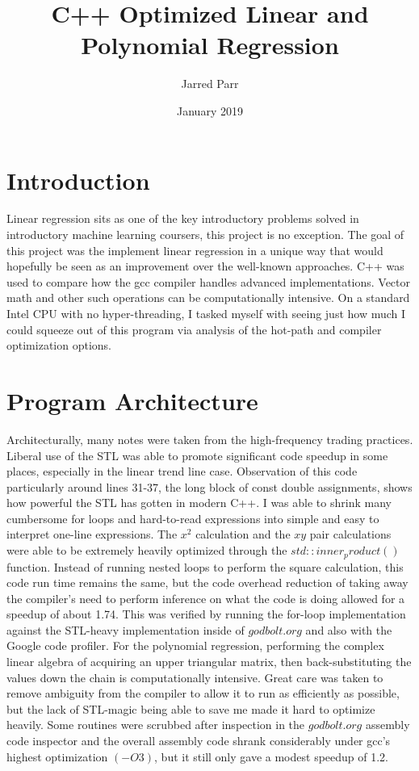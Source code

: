 \documentclass[11pt]{apa6}
\begin{document}
\title{C++ Optimized Linear and Polynomial Regression}
\author{Jarred Parr}
\affiliation{}
\date{January 2019}
\maketitle

\section{Introduction}
Linear regression sits as one of the key introductory problems solved in introductory machine learning coursers, this project is no exception. The goal of this project was the implement linear regression in a unique way that would
hopefully be seen as an improvement over the well-known approaches. C++ was used to compare how the gcc compiler handles advanced implementations. Vector math and other such operations can be computationally intensive. On a
standard Intel CPU with no hyper-threading, I tasked myself with seeing just how much I could squeeze out of this program via analysis of the hot-path and compiler optimization options.

\section{Program Architecture}
Architecturally, many notes were taken from the high-frequency trading practices. Liberal use of the STL was able to promote significant code speedup in some places, especially in the linear trend line case. Observation of this code
particularly around lines 31-37, the long block of const double assignments, shows how powerful the STL has gotten in modern C++. I was able to shrink many cumbersome for loops and hard-to-read expressions into simple and easy to
interpret one-line expressions. The $x^2$ calculation and the $xy$ pair calculations were able to be extremely heavily optimized through the $std::inner_product()$ function. Instead of running nested loops to perform the square
calculation, this code run time remains the same, but the code overhead reduction of taking away the compiler's need to perform inference on what the code is doing allowed for a speedup of about 1.74. This was verified by running
the for-loop implementation against the STL-heavy implementation inside of $godbolt.org$ and also with the Google code profiler. For the polynomial regression, performing the complex linear algebra of acquiring an upper triangular
matrix, then back-substituting the values down the chain is computationally intensive. Great care was taken to remove ambiguity from the compiler to allow it to run as efficiently as possible, but the lack of STL-magic being able
to save me made it hard to optimize heavily. Some routines were scrubbed after inspection in the $godbolt.org$ assembly code inspector and the overall assembly code shrank considerably under gcc's highest optimization $(-O3)$, but
it still only gave a modest speedup of 1.2.
\end{document}
